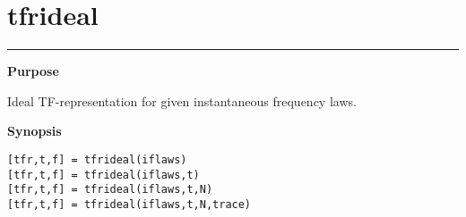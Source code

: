 

\section*{\hspace*{-1.6cm} tfrideal}

\vspace*{-.4cm}
\hspace*{-1.6cm}\rule[0in]{16.5cm}{.02cm}
\vspace*{.2cm}

{\bf \large \sf Purpose}\\
\hspace*{1.5cm}
\begin{minipage}[t]{13.5cm}
Ideal TF-representation for given instantaneous frequency laws.
\end{minipage}
\vspace*{.3cm}

{\bf \large \sf Synopsis}\\
\hspace*{1.5cm}
\begin{minipage}[t]{13.5cm}
\begin{verbatim}
[tfr,t,f] = tfrideal(iflaws)
[tfr,t,f] = tfrideal(iflaws,t)
[tfr,t,f] = tfrideal(iflaws,t,N)
[tfr,t,f] = tfrideal(iflaws,t,N,trace)
\end{verbatim}
\end{minipage}
\vspace*{.5cm}

